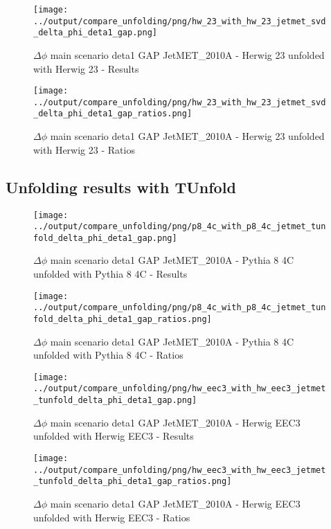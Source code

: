 \documentclass[11pt]{book}
\begin{document}
\begin{figure}[ht]
\centering
\texttt{[image: ../output/compare\_unfolding/png/hw\_23\_with\_hw\_23\_jetmet\_svd\_delta\_phi\_deta1\_gap.png]}
\caption{$\Delta\phi$ main scenario deta1 GAP JetMET\_2010A - Herwig 23 unfolded with Herwig 23 - Results}
\label{hw_23_hw_23_jetmet_svd_delta_phi_deta1_gap_a}
\end{figure}

\begin{figure}[ht]
\centering
\texttt{[image: ../output/compare\_unfolding/png/hw\_23\_with\_hw\_23\_jetmet\_svd\_delta\_phi\_deta1\_gap\_ratios.png]}
\caption{$\Delta\phi$ main scenario deta1 GAP JetMET\_2010A - Herwig 23 unfolded with Herwig 23 - Ratios}
\label{hw_23_hw_23_jetmet_svd_delta_phi_deta1_gap_b}
\end{figure}


\clearpage
\subsection{Unfolding results with TUnfold}

\begin{figure}[ht]
\centering
\texttt{[image: ../output/compare\_unfolding/png/p8\_4c\_with\_p8\_4c\_jetmet\_tunfold\_delta\_phi\_deta1\_gap.png]}
\caption{$\Delta\phi$ main scenario deta1 GAP JetMET\_2010A - Pythia 8 4C unfolded with Pythia 8 4C - Results}
\label{p8_p8_jetmet_tunfold_delta_phi_deta1_gap_a}
\end{figure}

\begin{figure}[ht]
\centering
\texttt{[image: ../output/compare\_unfolding/png/p8\_4c\_with\_p8\_4c\_jetmet\_tunfold\_delta\_phi\_deta1\_gap\_ratios.png]}
\caption{$\Delta\phi$ main scenario deta1 GAP JetMET\_2010A - Pythia 8 4C unfolded with Pythia 8 4C - Ratios}
\label{p8_p8_jetmet_tunfold_delta_phi_deta1_gap_b}
\end{figure}

\begin{figure}[ht]
\centering
\texttt{[image: ../output/compare\_unfolding/png/hw\_eec3\_with\_hw\_eec3\_jetmet\_tunfold\_delta\_phi\_deta1\_gap.png]}
\caption{$\Delta\phi$ main scenario deta1 GAP JetMET\_2010A - Herwig EEC3 unfolded with Herwig EEC3 - Results}
\label{hw_eec3_hw_eec3_jetmet_tunfold_delta_phi_deta1_gap_a}
\end{figure}

\begin{figure}[ht]
\centering
\texttt{[image: ../output/compare\_unfolding/png/hw\_eec3\_with\_hw\_eec3\_jetmet\_tunfold\_delta\_phi\_deta1\_gap\_ratios.png]}
\caption{$\Delta\phi$ main scenario deta1 GAP JetMET\_2010A - Herwig EEC3 unfolded with Herwig EEC3 - Ratios}
\label{hw_eec3_hw_eec3_jetmet_tunfold_delta_phi_deta1_gap_b}
\end{figure}
\end{document}
